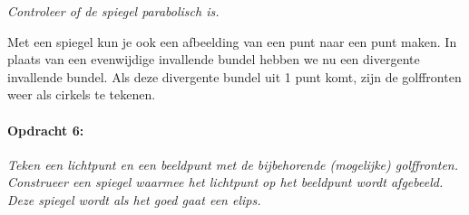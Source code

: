 \emph{Controleer of de spiegel parabolisch is.}

Met een spiegel kun je ook een afbeelding van een punt naar een punt
maken. In plaats van een evenwijdige invallende bundel hebben we nu
een divergente invallende bundel. Als deze divergente bundel uit 1
punt komt, zijn de golffronten weer als cirkels te tekenen.

\paragraph*{Opdracht 6:}

\emph{Teken een lichtpunt en een beeldpunt met de bijbehorende (mogelijke)
golffronten. Construeer een spiegel waarmee het lichtpunt op het beeldpunt
wordt afgebeeld. Deze spiegel wordt als het goed gaat een elips.}


